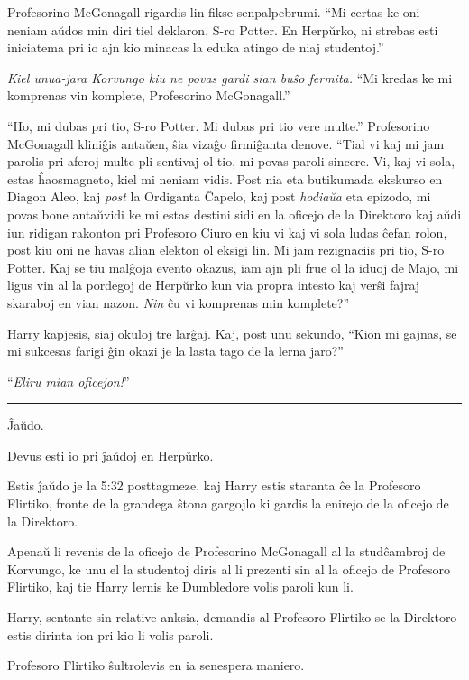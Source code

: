 Profesorino McGonagall rigardis lin fikse senpalpebrumi. ``Mi certas
ke oni neniam aŭdos min diri tiel deklaron, S-ro Potter. En Herpŭrko,
ni strebas esti iniciatema pri io ajn kio minacas la eduka atingo de
niaj studentoj.''

\emph{Kiel unua-jara Korvungo kiu ne povas gardi sian buŝo fermita.}
``Mi kredas ke mi komprenas vin komplete, Profesorino McGonagall.''

``Ho, mi dubas pri tio, S-ro Potter. Mi dubas pri tio vere multe.''
Profesorino McGonagall kliniĝis antaŭen, ŝia vizaĝo firmiĝanta
denove. ``Tial vi kaj mi jam parolis pri aferoj multe pli sentivaj ol
tio, mi povas paroli sincere. Vi, kaj vi sola, estas ĥaosmagneto, kiel
mi neniam vidis. Post nia eta butikumada ekskurso en Diagon Aleo,
kaj \emph{post} la Ordiganta Ĉapelo, kaj post \emph{hodiaŭa} eta
epizodo, mi povas bone antaŭvidi ke mi estas destini sidi en la
oficejo de la Direktoro kaj aŭdi iun ridigan rakonton pri Profesoro
Ciuro en kiu vi kaj vi sola ludas ĉefan rolon, post kiu oni ne havas
alian elekton ol eksigi lin. Mi jam rezignaciis pri tio, S-ro
Potter. Kaj se tiu malĝoja evento okazus, iam ajn pli frue ol la iduoj
de Majo, mi ligus vin al la pordegoj de Herpŭrko kun via propra
intesto kaj verŝi fajraj skaraboj en vian nazon. \emph{Nin} ĉu vi
komprenas min komplete?''

Harry kapjesis, siaj okuloj tre larĝaj. Kaj, post unu sekundo, ``Kion
mi gajnas, se mi sukcesas farigi ĝin okazi je la lasta tago de la
lerna jaro?''

``\emph{Eliru mian oficejon!}''

\begin{center}\rule{3in}{0.4pt}\end{center}

Ĵaŭdo.

Devus esti io pri ĵaŭdoj en Herpŭrko.

Estis ĵaŭdo je la 5:32 posttagmeze, kaj Harry estis staranta ĉe la
Profesoro Flirtiko, fronte de la grandega ŝtona gargojlo ki gardis la
enirejo de la oficejo de la Direktoro.

Apenaŭ li revenis de la oficejo de Profesorino McGonagall al la
studĉambroj de Korvungo, ke unu el la studentoj diris al li prezenti
sin al la oficejo de Profesoro Flirtiko, kaj tie Harry lernis ke
Dumbledore volis paroli kun li.

Harry, sentante sin relative anksia, demandis al Profesoro Flirtiko se
la Direktoro estis dirinta ion pri kio li volis paroli.

Profesoro Flirtiko ŝultrolevis en ia senespera maniero.

